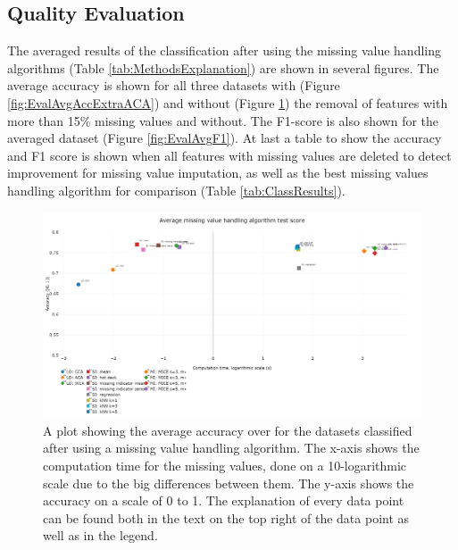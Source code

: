 \documentclass[10pt,a4paper]{article}
\begin{document}
	\subsection{Quality Evaluation}
	\label{subsec:QualityEvaluationResults}
	
	The averaged results of the classification after using the missing value handling algorithms (Table \ref{tab:MethodsExplanation}) are shown in several figures. The average accuracy is shown for all three datasets with (Figure \ref{fig:EvalAvgAccExtraACA}) and without (Figure \ref{fig:EvalAvgAcc}) the removal of features with more than 15\% missing values  and without. The F1-score is also shown for the averaged dataset (Figure \ref{fig:EvalAvgF1}). At last a table to show the accuracy and F1 score is shown when all features with missing values are deleted to detect improvement for missing value imputation, as well as the best missing values handling algorithm for comparison (Table \ref{tab:ClassResults}).
	
	\begin{figure}[H]
		\centering
		\includegraphics[angle=90,height=0.9\textheight]{avg_acc.PNG}
		\caption{A plot showing the average accuracy over for the datasets classified after using a missing value handling algorithm. The x-axis shows the computation time for the missing values, done on a 10-logarithmic scale due to the big differences between them. The y-axis shows the accuracy on a scale of 0 to 1. The explanation of every data point can be found both in the text on the top right of the data point as well as in the legend.}
		\label{fig:EvalAvgAcc}
	\end{figure}
\end{document}
